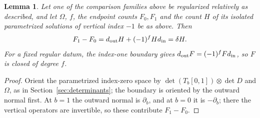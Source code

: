 \documentclass[11pt]{amsart}
\newtheorem{lemma}[theorem]{Lemma}
\theoremstyle{definition}
\theoremstyle{remark}
\theoremstyle{plain}
\numberwithin{equation}{section}
\begin{document}
\begin{lemma}\label{lem:family-signs}
Let one of the comparison families above be regularized relatively as
described, and let $\Omega$, $f$, the endpoint counts $F_0,F_1$ and the
count $H$ of its isolated parametrized solutions of vertical index $-1$ be
as above. Then
\begin{equation}\label{eq:family-homotopy}
 F_1-F_0=d_{\rm out}H+(-1)^fHd_{\rm in}=\delta H .
\end{equation}
For a fixed regular datum, the index-one boundary gives
$d_{\rm out}F=(-1)^fFd_{\rm in}$, so $F$ is closed of degree $f$.
\end{lemma}
\begin{proof}
Orient the parametrized index-zero space by $\det(T_b[0,1])\otimes\det D$
and $\Omega$, as in Section~\ref{sec:determinants}; the boundary is
oriented by the outward normal first. At $b=1$ the outward normal is
$\partial_b$, and at $b=0$ it is $-\partial_b$; there the vertical
operators are invertible, so these contribute $F_1-F_0$.


\end{proof}
\end{document}
